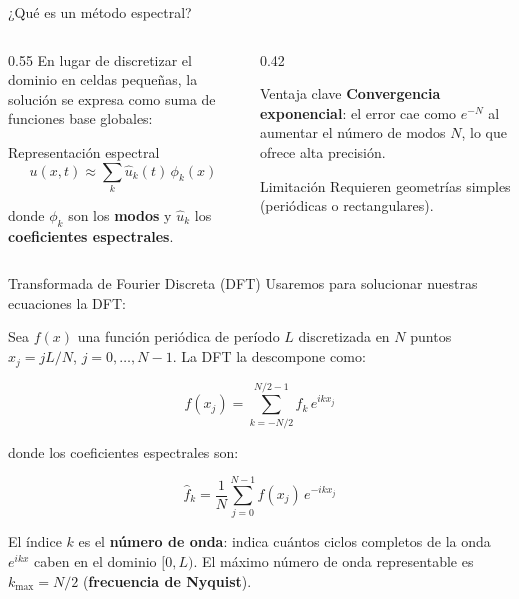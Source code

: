 \documentclass[aspectratio=169, 12pt]{beamer}
\newcommand{\that}[1]{\hat{#1}}
\begin{document}
\begin{frame}{¿Qué es un método espectral?}
  \begin{columns}
    \begin{column}{0.55\textwidth}
      En lugar de discretizar el dominio en celdas pequeñas,
      la solución se expresa como suma de funciones base globales:
 
      \vspace{0.5em}
      \begin{block}{Representación espectral}
        \[
          u(x,t) \approx \sum_k \hat{u}_k(t)\,\phi_k(x)
        \]
      \end{block}
 
      \vspace{0.5em}
      donde $\phi_k$ son los \textbf{modos} y $\hat{u}_k$ los
      \textbf{coeficientes espectrales}.
    \end{column}
    \begin{column}{0.42\textwidth}
      \begin{block}{Ventaja clave}
        \textbf{Convergencia exponencial}: el error cae como
        $e^{-N}$ al aumentar el número de modos $N$, lo que ofrece alta precisión.
      \end{block}
 
      \vspace{0.5em}
      \begin{alertblock}{Limitación}
        Requieren geometrías simples (periódicas o rectangulares).
      \end{alertblock}
    \end{column}
  \end{columns}
\end{frame}

\begin{frame}{Transformada de Fourier Discreta (DFT)}
Usaremos para solucionar nuestras ecuaciones la DFT:

Sea $f(x)$ una función periódica de período $L$ discretizada en
$N$ puntos $x_j = jL/N$, $j = 0,\ldots,N-1$.
La DFT la descompone como:
 

  $$f(x_j) = \sum_{k=-N/2}^{N/2-1} \that{f}_k\,e^{ikx_j}$$

 
donde los coeficientes espectrales son:

  $$\that{f}_k = \frac{1}{N}\sum_{j=0}^{N-1} f(x_j)\,e^{-ikx_j}$$

El índice $k$ es el \textbf{número de onda}: indica cuántos ciclos
completos de la onda $e^{ikx}$ caben en el dominio $[0,L)$.
El máximo número de onda representable es $k_{\max} = N/2$
(\textbf{frecuencia de Nyquist}).

  
\end{frame}
\end{document}
